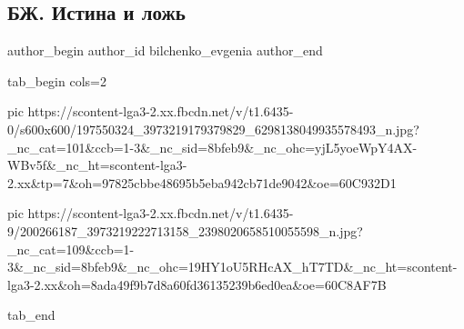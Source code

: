  
 
 
 
 
 
\subsection{БЖ. Истина и ложь}
\label{sec:12_06_2021.fb.bilchenko_evgenia.6.istina_i_lozh}
\ifcmt
 author_begin
   author_id bilchenko_evgenia
 author_end
\fi

\ifcmt
  tab_begin cols=2

     pic https://scontent-lga3-2.xx.fbcdn.net/v/t1.6435-0/s600x600/197550324_3973219179379829_6298138049935578493_n.jpg?_nc_cat=101&ccb=1-3&_nc_sid=8bfeb9&_nc_ohc=yjL5yoeWpY4AX-WBv5f&_nc_ht=scontent-lga3-2.xx&tp=7&oh=97825cbbe48695b5eba942cb71de9042&oe=60C932D1

     pic https://scontent-lga3-2.xx.fbcdn.net/v/t1.6435-9/200266187_3973219222713158_2398020658510055598_n.jpg?_nc_cat=109&ccb=1-3&_nc_sid=8bfeb9&_nc_ohc=19HY1oU5RHcAX_hT7TD&_nc_ht=scontent-lga3-2.xx&oh=8ada49f9b7d8a60fd36135239b6ed0ea&oe=60C8AF7B

  tab_end
\fi

